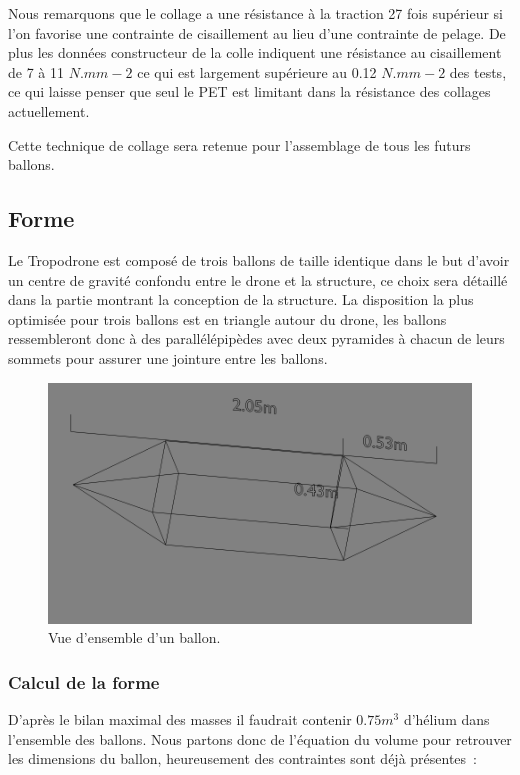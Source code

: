 \documentclass[a4paper,11pt]{article}
\begin{document}
Nous remarquons que le collage a une résistance à la traction 27 fois supérieur si l'on favorise une contrainte de cisaillement au lieu d'une contrainte de pelage.
De plus les données constructeur de la colle indiquent une résistance au cisaillement de 7 à 11 $N.mm-2$ ce qui est largement supérieure au 0.12 $N.mm-2$ des tests, ce qui laisse penser que seul le PET est limitant dans la résistance des collages actuellement.


Cette technique de collage sera retenue pour l'assemblage de tous les futurs ballons.

\subsection{Forme}

Le Tropodrone est composé de trois ballons de taille identique dans le but d'avoir un centre de gravité confondu entre le drone et la structure, ce choix sera détaillé dans la partie montrant la conception de la structure.
La disposition la plus optimisée pour trois ballons est en triangle autour du drone, les ballons ressembleront donc à des parallélépipèdes avec deux pyramides à chacun de leurs sommets pour assurer une jointure entre les ballons.

\begin{figure}[H]
	\centering
 \includegraphics[width=12cm]{../Images/ballon.png}
 \caption{Vue d'ensemble d'un ballon.}
\end{figure}

\subsubsection{Calcul de la forme}

D'après le bilan maximal des masses il faudrait contenir $0.75m^3$ d'hélium dans l'ensemble des ballons. Nous partons donc de l'équation du volume pour retrouver les dimensions du ballon, heureusement des contraintes sont déjà présentes~:
\end{document}
